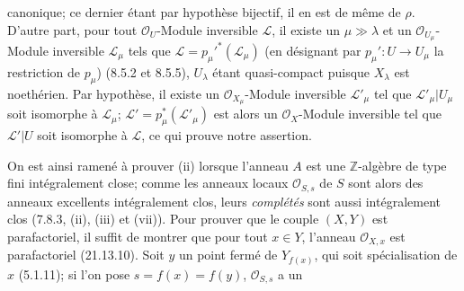 canonique; ce dernier étant par hypothèse bijectif, il en est de même de $\rho$.
D'autre part, pour tout $\mathcal O_U$-Module inversible $\mathscr L$, il existe un
$\mu\gg\lambda$ et un $\mathcal O_{U_\mu}$-Module inversible $\mathscr L_\mu$ tels
que $\mathscr L=p_\mu'^*(\mathscr L_\mu)$ (en désignant par
$p_\mu':U\to U_\mu$ la restriction de $p_\mu$) (8.5.2 et 8.5.5), $U_\lambda$ étant
quasi-compact puisque $X_\lambda$ est noethérien. Par hypothèse, il existe un
$\mathcal O_{X_\mu}$-Module inversible $\mathscr L'_\mu$ tel que
$\mathscr L'_\mu|U_\mu$ soit isomorphe à $\mathscr L_\mu$;
$\mathscr L'=p_\mu^*(\mathscr L'_\mu)$ est alors un $\mathcal O_X$-Module
inversible tel que $\mathscr L'|U$ soit isomorphe à $\mathscr L$, ce qui prouve notre
assertion.

On est ainsi ramené à prouver (ii) lorsque l'anneau $A$ est une
$\mathbb Z$-algèbre de type fini intégralement close; comme les anneaux locaux
$\mathcal O_{S,s}$ de $S$ sont alors des anneaux excellents intégralement clos, leurs
\emph{complétés} sont aussi intégralement clos (7.8.3, (ii), (iii) et (vii)). Pour
prouver que le couple $(X,Y)$ est parafactoriel, il suffit de montrer que pour tout
$x\in Y$, l'anneau $\mathcal O_{X,x}$ est parafactoriel (21.13.10). Soit $y$ un point
fermé de $Y_{f(x)}$, qui soit spécialisation de $x$ (5.1.11); si l'on pose
$s=f(x)=f(y)$, $\mathcal O_{S,s}$ a un
